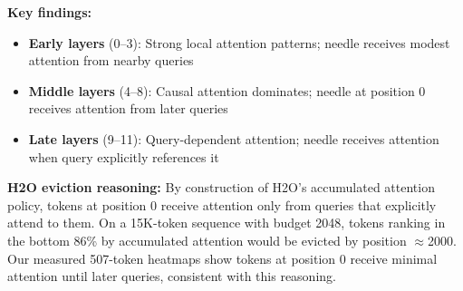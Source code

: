 \documentclass[11pt]{article}
\begin{document}
\textbf{Key findings:}
\begin{itemize}
\item \textbf{Early layers} (0--3): Strong local attention patterns; needle receives modest attention from nearby queries
\item \textbf{Middle layers} (4--8): Causal attention dominates; needle at position 0 receives attention from later queries
\item \textbf{Late layers} (9--11): Query-dependent attention; needle receives attention when query explicitly references it
\end{itemize}

\textbf{H2O eviction reasoning:} By construction of H2O's accumulated attention policy, tokens at position 0 receive attention only from queries that explicitly attend to them. On a 15K-token sequence with budget 2048, tokens ranking in the bottom 86\% by accumulated attention would be evicted by position $\approx$2000. Our measured 507-token heatmaps show tokens at position 0 receive minimal attention until later queries, consistent with this reasoning.
\end{document}

